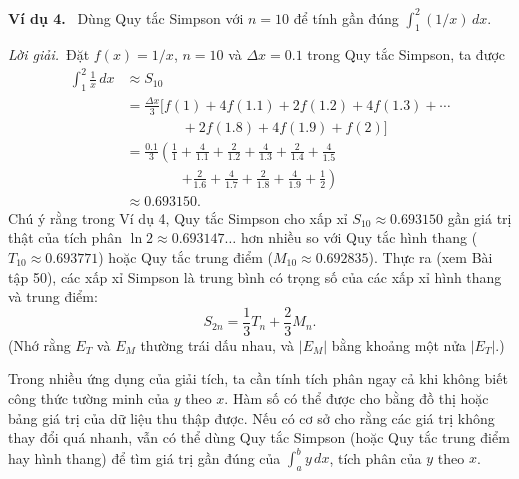 \documentclass[12pt,a4paper]{article}
\newcommand{\ex}[1]{\par\medskip\noindent\textbf{Ví dụ #1.}\ }
\newcommand{\sol}{\par\nopagebreak[4]\noindent\textit{Lời giải.}\ }
\begin{document}
\ex{4} Dùng Quy tắc Simpson với $n=10$ để tính gần đúng $\int_1^2(1/x)\,dx$.
\sol Đặt $f(x)=1/x$, $n=10$ và $\Delta x=0.1$ trong Quy tắc Simpson, ta được
\begin{align*}
\int_1^2\frac1x\,dx&\approx S_{10}\\
&=\frac{\Delta x}{3}[f(1)+4f(1.1)+2f(1.2)+4f(1.3)+\cdots\\
&\qquad\qquad+2f(1.8)+4f(1.9)+f(2)]\\
&=\frac{0.1}{3}\left(\frac11+\frac4{1.1}+\frac2{1.2}+\frac4{1.3}+\frac2{1.4}+\frac4{1.5}\right.\\
&\qquad\qquad\left.+\frac2{1.6}+\frac4{1.7}+\frac2{1.8}+\frac4{1.9}+\frac12\right)\\
&\approx0.693150.
\end{align*}
Chú ý rằng trong Ví dụ 4, Quy tắc Simpson cho xấp xỉ $S_{10}\approx0.693150$ gần giá trị thật của tích phân $\ln2\approx0.693147\ldots$ hơn nhiều so với Quy tắc hình thang ($T_{10}\approx0.693771$) hoặc Quy tắc trung điểm ($M_{10}\approx0.692835$). Thực ra (xem Bài tập 50), các xấp xỉ Simpson là trung bình có trọng số của các xấp xỉ hình thang và trung điểm:
\[S_{2n}=\frac13T_n+\frac23M_n.\]
(Nhớ rằng $E_T$ và $E_M$ thường trái dấu nhau, và $|E_M|$ bằng khoảng một nửa $|E_T|$.)

Trong nhiều ứng dụng của giải tích, ta cần tính tích phân ngay cả khi không biết công thức tường minh của $y$ theo $x$. Hàm số có thể được cho bằng đồ thị hoặc bảng giá trị của dữ liệu thu thập được. Nếu có cơ sở cho rằng các giá trị không thay đổi quá nhanh, vẫn có thể dùng Quy tắc Simpson (hoặc Quy tắc trung điểm hay hình thang) để tìm giá trị gần đúng của $\int_a^b y\,dx$, tích phân của $y$ theo $x$.
\end{document}
